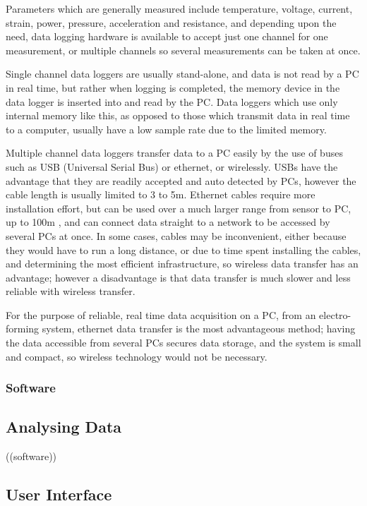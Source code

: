 Parameters which are generally measured include temperature, voltage, current, strain, power, pressure, acceleration and resistance, and depending upon the need, data logging hardware is available to accept just one channel for one measurement, or multiple channels so several measurements can be taken at once. 

Single channel data loggers are usually stand-alone, and data is not read by a PC in real time, but rather when logging is completed, the memory device in the data logger is inserted into and read by the PC. Data loggers which use only internal memory like this, as opposed to those which transmit data in real time to a computer, usually have a low sample rate due to the limited memory.

Multiple channel data loggers transfer data to a PC easily by the use of buses such as USB (Universal Serial Bus) or ethernet, or wirelessly. USBs have the advantage that they are readily accepted and auto detected by PCs, however the cable length is usually limited to 3 to 5m. Ethernet cables require more installation effort, but can be used over a much larger range from sensor to PC, up to 100m \cite{NatInstruments}, and can connect data straight to a network to be accessed by several PCs at once. In some cases, cables may be inconvenient, either because they would have to run a long distance, or due to time spent installing the cables, and determining the most efficient infrastructure, so wireless data transfer has an advantage; however a disadvantage is that data transfer is much slower and less reliable with wireless transfer.

For the purpose of reliable, real time data acquisition on a PC, from an electro-forming system, ethernet data transfer is the most advantageous method; having the data accessible from several PCs secures data storage, and the system is small and compact, so wireless technology would not be necessary. 

\subsubsection{Software}

 
\subsection{Analysing Data}  ((software))

\subsection{User Interface}

